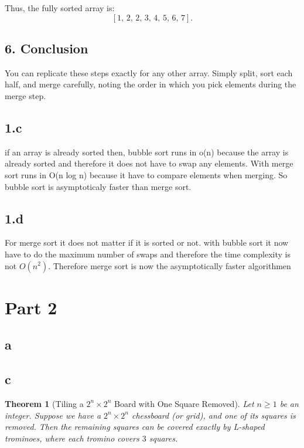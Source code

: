 \documentclass{article}
\newtheorem{theorem}{Theorem}
\theoremstyle{remark}
\begin{document}
Thus, the fully sorted array is:
\[
\boxed{[1,\,2,\,2,\,3,\,4,\,5,\,6,\,7]}.
\]

\subsection*{6. Conclusion}
You can replicate these steps exactly for any other array. 
Simply split, sort each half, and merge carefully, 
noting the order in which you pick elements during the merge step. 

\subsection{1.c}

if an array is already sorted then, bubble sort runs in o(n) because the array is already sorted and therefore it does not have to swap any elements. With merge sort runs in O(n log n) because it have to compare elements when merging. So bubble sort is asymptoticaly faster than merge sort.

\subsection{1.d}

For merge sort it does not matter if it is sorted or not. with bubble sort it now have to do the maximum number of swaps and therefore the time complexity is not $O(n^2)$. Therefore merge sort is now the asymptotically faster algorithmen



\newpage
\section{Part 2}


\subsection{a}


\subsection{c}


\begin{theorem}[Tiling a $2^n \times 2^n$ Board with One Square Removed]
Let $n \ge 1$ be an integer. Suppose we have a $2^n \times 2^n$ chessboard (or grid), and one of its squares is removed. Then the remaining squares can be covered exactly by L-shaped trominoes, where each tromino covers $3$ squares.
\end{theorem}
\end{document}
